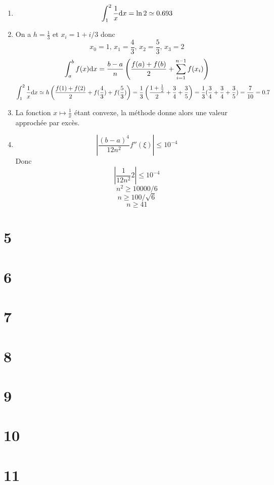 \documentclass[a4paper]{article}
\def \de {{\rm d}}
\begin{document}
\begin{enumerate}
\item \[\int_1^2\frac 1x\de x=\ln 2\simeq 0.693\]
\item On a $h=\frac 13$ et $x_i=1+i/3$ donc
\[x_0=1,\, x_1=\frac 43,\,x_2=\frac 53,\, x_3=2\]
\[\int_a^bf(x)\de x=\frac{b-a}{n}\left(\frac{f(a)+f(b)}{2}+\sum_{i=1}^{n-1}f(x_i)\right)\]
\[\int_1^2\frac 1x\de x\simeq h\left(\frac{f(1)+f(2)}{2}+f(\frac 43)+f(\frac 53)\right)=\frac 13\left(\frac{1+\frac 12}{2}+\frac 34+\frac 35\right)=\frac 13(\frac 34+\frac 34+\frac 35)=\frac 7{10}=0.7\]
\item La fonction $x\mapsto \frac 1x$ étant convexe, la méthode donne alors une valeur approchée par excès.
\item \[\left|\frac{(b-a)^4}{12n^2}f''(\xi)\right|\leq 10^{-4}\]
Donc 
 \[\left|\frac{1}{12n^2}2\right|\leq 10^{-4}\]
 \[n^2\geq 10000/6\]
 \[n\geq 100/\sqrt 6\]
 \[n\geq 41\]
\end{enumerate}
\section*{5}
\section*{6}
\section*{7}
\section*{8}
\section*{9}
\section*{10}
\section*{11}
\end{document}
